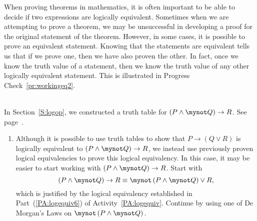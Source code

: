 When proving theorems in mathematics, it is often important to be able to decide if two expressions are logically equivalent.  Sometimes when we are attempting to prove a theorem, we may be unsuccessful in  developing a proof for the original statement of the theorem.  However, in some cases, it is possible to prove an equivalent statement.  Knowing that the statements are equivalent tells us that if we prove one, then we have also proven the other.  In fact, once we know the truth value of a statement, then we know the truth value of any other logically equivalent statement.  This is illustrated in Progress Check~\ref{pr:workingeq2}.
\begin{prog} \label{pr:workingeq2} \hfill \\
In Section~\ref{S:logop}, we constructed a truth table for  
$\left( {P \wedge \mynot  Q} \right) \to R$.  See page~\pageref{Ta:compoundtruthtable}.  
%
%
\begin{enumerate}
\item Although it is possible to use truth tables to show that 
$P \to \left( {Q \vee R} \right)$ is logically equivalent to  
$\left( {P \wedge \mynot  Q} \right) \to R$, we instead use previously proven logical equivalencies to prove this logical equivalency.  In this case, it may be easier to start working with $\left( {P \wedge \mynot  Q} \right) \to R$.  Start with
\[
\left( {P \wedge \mynot  Q} \right) \to R \equiv \mynot \left( P \wedge \mynot Q \right) \vee R,
\]
which is justified by the logical equivalency established in Part~(\ref{PA:logequiv6}) of 
\typeu Activity~\ref*{PA:logequiv}.  Continue by using one of De Morgan's Laws on  
$\mynot \left( P \wedge \mynot Q \right)$.


\end{enumerate}
\end{prog}
